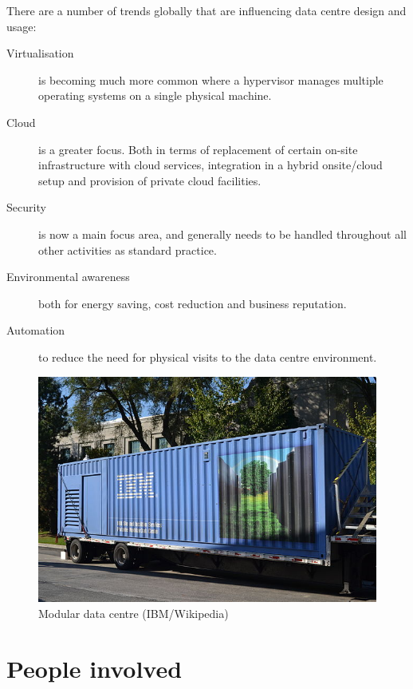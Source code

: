\documentclass{pgnotes}
\begin{document}
There are a number of trends globally that are influencing data centre design and usage:
\begin{description}
\item[Virtualisation] is becoming much more common where a hypervisor manages multiple operating systems on a single physical machine. 
\item[Cloud] is a greater focus.  Both in terms of replacement of certain on-site infrastructure with cloud services, integration in a hybrid onsite/cloud setup and provision of private cloud facilities.
\item[Security] is now a main focus area, and generally needs to be handled throughout all other activities as standard practice.
\item[Environmental awareness] both for energy saving, cost reduction and business reputation. 
\item[Automation] to reduce the need for physical visits to the data centre environment.
\end{description}

\begin{figure}[htbp]
  \centering
  \includegraphics[width=1.0\linewidth]{modular_data_centre}
  \caption{Modular data centre (IBM/Wikipedia)}
  \label{fig:modular-data-centre}
\end{figure}

\section{People involved}
\end{document}
